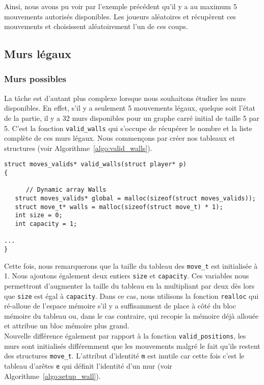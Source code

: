 \documentclass[a4paper]{article}
\begin{document}
Ainsi, nous avons pu voir par l'exemple précédent qu'il y a au maximum 5 mouvements autorisés disponibles. Les joueurs aléatoires  et  récupèrent ces mouvements et choisissent aléatoirement l'un de ces coups.

\subsection{Murs légaux}

\subsubsection{Murs possibles}
\label{subsect:valid_walls}
La tâche est d'autant plus complexe lorsque nous souhaitons étudier les murs disponibles. En effet, s'il y a seulement 5 mouvements légaux, quelque soit l'état de la partie, il y a 32 murs disponibles pour un graphe carré initial de taille 5 par 5. C'est la fonction \texttt{valid\_walls} qui s'occupe de récupérer le nombre et la liste complète de ces murs légaux. Nous commençons par créer nos tableaux et structures (voir Algorithme~\ref{algo:valid_walls}). \\

\begin{lstlisting}[caption = {Entête de la fonction déterminant les murs légaux}, label = {algo:valid_walls}, float = h]
struct moves_valids* valid_walls(struct player* p)
{
   
      // Dynamic array Walls
   struct moves_valids* global = malloc(sizeof(struct moves_valids)); 
   struct move_t* walls = malloc(sizeof(struct move_t) * 1); 
   int size = 0; 
   int capacity = 1; 
   
...
}
\end{lstlisting}

Cette fois, nous remarquerons que la taille du tableau des \texttt{move\_t} est initialisée à 1. Nous ajoutons également deux entiers \texttt{size} et \texttt{capacity}. Ces variables nous permettront d'augmenter la taille du tableau en la multipliant par deux dès lors que \texttt{size} est égal à \texttt{capacity}. Dans ce cas, nous utilisons la fonction \texttt{realloc} qui ré-alloue de l'espace mémoire s'il y a suffisamment de place à côté du bloc mémoire du tableau ou, dans le cas contraire, qui recopie la mémoire déjà allouée et attribue un bloc mémoire plus grand. \\

Nouvelle différence également par rapport à la fonction \texttt{valid\_positions}, les murs sont initialisés différemment que les mouvements malgré le fait qu'ils restent des structures \texttt{move\_t}. L'attribut d'identité \texttt{m} est inutile car cette fois c'est le tableau d'arêtes \texttt{e} qui définit l'identité d'un mur (voir Algorithme~\ref{algo:setup_wall}). 
\end{document}
